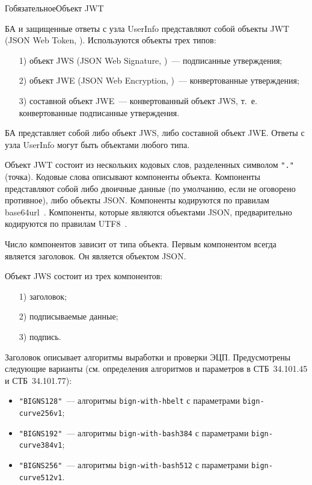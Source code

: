 \begin{appendix}{Г}{обязательное}{Объект JWT}\label{JWT}


БА и защищенные ответы с узла UserInfo представляют собой объекты 
JWT (JSON Web Token, \cite{RFC7519}).
%
Используются объекты трех типов: 
\begin{itemize}
\item[1)] 
объект JWS (JSON Web Signature, \cite{RFC7515})~--- подписанные утверждения;
\item[2)] 
объект JWE (JSON Web Encryption, \cite{RFC7516})~--- конвертованные утверждения;
\item[3)] 
составной объект JWE~--- конвертованный объект JWS, т.~е. конвертованные 
подписанные утверждения.
\end{itemize}

БА представляет собой либо объект JWS, либо составной объект JWЕ.
Ответы с узла UserInfo могут быть объектами любого типа. 

Объект JWT состоит из нескольких кодовых слов, разделенных символом
\lstinline{"."} (точка). Кодовые слова описывают компоненты объекта. 
%
Компоненты представляют собой либо двоичные данные (по умолчанию, если не 
оговорено противное), либо объекты JSON.
%
Компоненты кодируются по правилам base64url~\cite{RFC4648}. 
Компоненты, которые являются объектами JSON, предварительно кодируются по 
правилам UTF8~\cite{UTF8}.

Число компонентов зависит от типа объекта. Первым компонентом всегда является 
заголовок. Он является объектом JSON.

\label{JWT.JWS}

Объект JWS состоит из трех компонентов:
\begin{enumerate}
\item[1)]
заголовок;
\item[2)]
подписываемые данные;
\item[3)]
подпись.
\end{enumerate}

Заголовок описывает алгоритмы выработки и проверки ЭЦП. Предусмотрены следующие 
варианты (см. определения алгоритмов и параметров в СТБ~34.101.45 и 
СТБ~34.101.77): 
\begin{itemize}
\item
\lstinline{"BIGNS128"}~--- алгоритмы \lstinline{bign-with-hbelt} с параметрами  
\lstinline{bign-curve256v1};
\item
\lstinline{"BIGNS192"}~--- алгоритмы \lstinline{bign-with-bash384} с 
параметрами \lstinline{bign-curve384v1};
\item
\lstinline{"BIGNS256"}~--- алгоритмы \lstinline{bign-with-bash512} с 
параметрами \lstinline{bign-curve512v1}.
\end{itemize}


\end{appendix}
